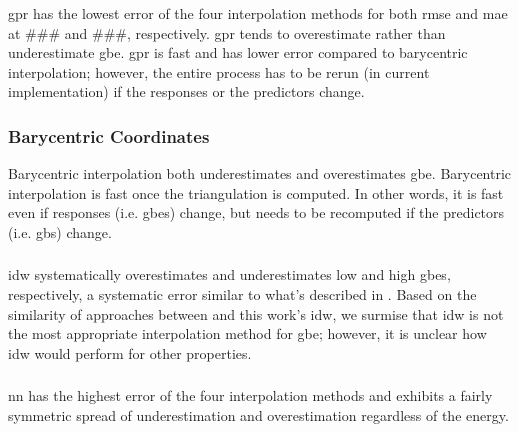 \documentclass[preprint,12pt]{elsarticle}
\begin{document}
\subsubsection{} \label{results:mdlerror:gpr}
\Gls{gpr} has the lowest error of the four interpolation methods for both \gls{rmse} and \gls{mae} at ### and ###, respectively. \Gls{gpr} tends to overestimate rather than underestimate \gls{gbe}. \Gls{gpr} is fast and has lower error compared to barycentric interpolation; however, the entire process has to be rerun (in current implementation) if the responses or the predictors change.

\subsubsection{Barycentric Coordinates} \label{results:mdlerror:bary}
Barycentric interpolation both underestimates and overestimates \gls{gbe}. Barycentric interpolation is fast once the triangulation is computed. In other words, it is fast even if responses (i.e. \glspl{gbe}) change, but needs to be recomputed if the predictors (i.e. \glspl{gb}) change.

\subsubsection{} \label{results:mdlerror:idw}
\Gls{idw} systematically overestimates and underestimates low and high \glspl{gbe}, respectively, a systematic error similar to what's described in \cite{chesserLearningGrainBoundary2020}. Based on the similarity of approaches between \cite{chesserLearningGrainBoundary2020} and this work's \gls{idw}, we surmise that \gls{idw} is not the most appropriate interpolation method for \gls{gbe}; however, it is unclear how \gls{idw} would perform for other properties.

\subsubsection{} \label{results:mdlerror:nn}
\Gls{nn} has the highest error of the four interpolation methods and exhibits a fairly symmetric spread of underestimation and overestimation regardless of the energy.
    
\end{document}
